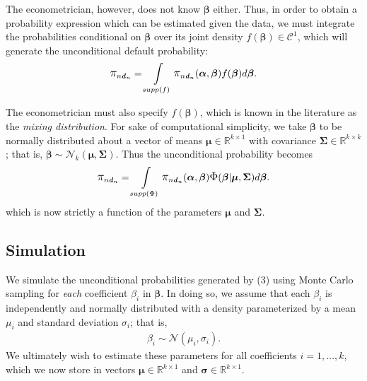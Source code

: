 \documentclass[12pt]{article}
\begin{document}
The econometrician, however, does not know $\boldsymbol{\beta}$ either. Thus, in order to obtain a probability expression which can be estimated given the data, we must integrate the probabilities conditional on $\boldsymbol{\beta}$ over its joint density $f(\boldsymbol{\beta}) \in \mathcal{C}^1$, which will generate the unconditional default probability:
\begin{gather*}
\mathlarger{\pi}_{n\boldsymbol{\mathit{d}}_n} = \int\limits_{supp(f)} \mathlarger{\pi}_{n\boldsymbol{\mathit{d}}_n}(\boldsymbol{\alpha},\boldsymbol{\beta}) f(\boldsymbol{\beta}) d\boldsymbol{\beta}.
\end{gather*}

The econometrician must also specify $f(\boldsymbol{\beta})$, which is known in the literature as the \textit{mixing distribution}. For sake of computational simplicity, we take $\boldsymbol{\beta}$ to be normally distributed about a vector of means $\boldsymbol{\mu} \in \mathbb{R}^{k \times 1}$ with covariance $\boldsymbol{\Sigma} \in \mathbb{R}^{k \times k}$; that is, $\boldsymbol{\beta} \sim \mathcal{N}_k(\boldsymbol{\mu}, \boldsymbol{\Sigma})$. Thus the unconditional probability becomes 
\begin{align}
\mathlarger{\pi}_{n\boldsymbol{\mathit{d}}_n} = \int\limits_{supp(\Phi)} \mathlarger{\pi}_{n\boldsymbol{\mathit{d}}_n}(\boldsymbol{\alpha},\boldsymbol{\beta}) \mathlarger{\Phi}(\boldsymbol{\beta}|\boldsymbol{\mu}, \boldsymbol{\Sigma}) d\boldsymbol{\beta}.
\end{align}
which is now strictly a function of the parameters $\boldsymbol{\mu}$ and $\boldsymbol{\Sigma}$.

\subsection{Simulation}

We simulate the unconditional probabilities generated by (3) using Monte Carlo sampling for \textit{each} coefficient $\beta_i$ in $\boldsymbol{\beta}$. In doing so, we assume that each $\beta_i$ is independently and normally distributed with a density parameterized by a mean $\mu_i$ and standard deviation $\sigma_i$; that is, 
\begin{gather*}
\beta_i \sim \mathcal{N}(\mu_i, \sigma_i).
\end{gather*}
We ultimately wish to estimate these parameters for all coefficients $i = 1, \dots, k$, which we now store in vectors $\boldsymbol{\mu} \in \mathbb{R}^{k \times 1}$ and $\boldsymbol{\sigma} \in \mathbb{R}^{k \times 1}$.
\end{document}

